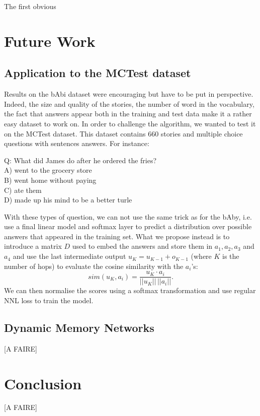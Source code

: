 \documentclass[twoside,11pt]{article}
\begin{document}
The first obvious 
\section{Future Work}
\subsection{Application to the MCTest dataset}
Results on the bAbi dataset were encouraging but have to be put in perspective. Indeed, the size and quality of the stories, the number of word in the vocabulary, the fact that answers appear both in the training and test data make it a rather easy dataset to work on. In order to challenge the algorithm, we wanted to test it on the MCTest dataset. This dataset contains 660 stories and multiple choice questions with sentences answers. For instance:
\begin{framed}
\begin{center}
Q:  What did James do after he ordered the fries?\\
A) went to the grocery store\\
B) went home without paying\\
C) ate them\\
D) made up his mind to be a better turle\\
\end{center}
\end{framed}
\noindent With these types of question, we can not use the same trick as for the bAby, i.e. use a final linear model and softmax layer to predict a distribution over possible answers that appeared in the training set. What we propose instead is to introduce a matrix $D$ used to embed the answers and store them in $a_1, a_2, a_3$ and $a_4$ and use the last intermediate output $u_K = u_{K-1} + o_{K-1}$ (where $K$ is the number of hops) to evaluate the cosine similarity with the $a_i$'s:
$$sim(u_K,a_i) = \frac{u_K \cdot a_i}{||u_K||\,||a_i||}.$$ We can then normalise the scores using a softmax transformation and use regular NNL loss to train the model.

\subsection{Dynamic Memory Networks}
[A FAIRE]
\section{Conclusion}
[A FAIRE]
\vskip 0.2in

\end{document}
